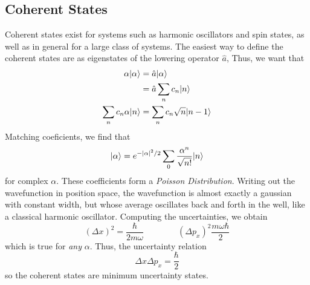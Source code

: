 \subsection{Coherent States}
Coherent states exist for systems such as harmonic oscillators and spin states, as well as in general for a large class of systems. The easiest way to define the coherent states are as eigenstates of the lowering operator \(\hat a\), Thus, we want that
\begin{align*}
	\alpha\lvert\alpha\rangle&=\hat a \lvert\alpha\rangle\\
		      &= \hat a \sum_n c_n \lvert n\rangle\\
	\sum_nc_n\alpha\lvert n\rangle&= \sum_n c_n\sqrt{n}\lvert n-1\rangle\\
\end{align*}
Matching coeficients, we find that
\begin{equation}
	\lvert\alpha\rangle = e^{-\left|\alpha\right|^2/2}\sum_0\frac{\alpha^n}{\sqrt{n!}}\lvert n\rangle
\end{equation}
for complex \(\alpha\). These coefficients form a \emph{Poisson Distribution}. Writing out the wavefunction in position space, the wavefunction is almost exactly a gaussian with constant width, but whose average oscillates back and forth in the well, like a classical harmonic oscillator. Computing the uncertainties, we obtain
\begin{equation}
	\left(\Delta x\right)^2 = \frac{\hbar}{2m\omega} \qquad\qquad \left(\Delta p_x\right)^2\frac{m\omega \hbar}{2}
\end{equation}
which is true for \emph{any} \(\alpha\). Thus, the uncertainty relation
\begin{equation}
	\Delta x \Delta p_x = \frac{\hbar}{2}
\end{equation}
so the coherent states are minimum uncertainty states.

